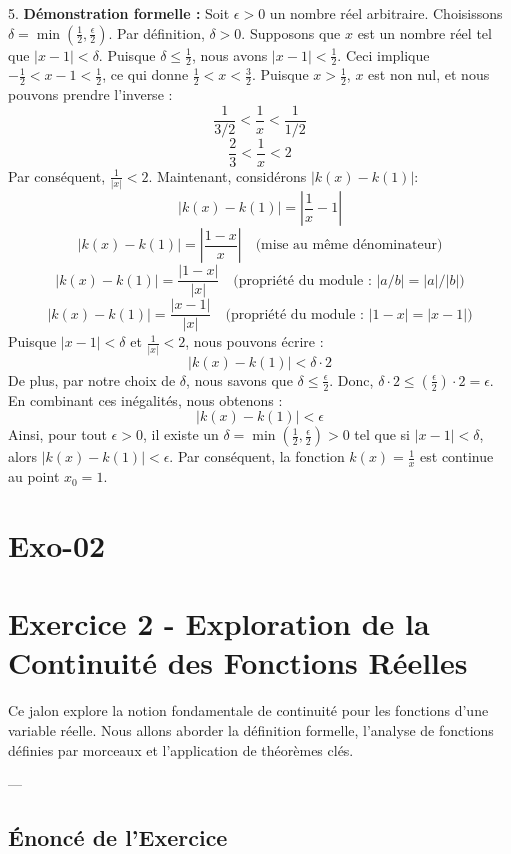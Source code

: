 \documentclass[12pt,a4paper]{report}
\begin{document}
5.  \textbf{Démonstration formelle :}
    Soit $\epsilon > 0$ un nombre réel arbitraire.
    Choisissons $\delta = \min\left(\frac{1}{2}, \frac{\epsilon}{2}\right)$. Par définition, $\delta > 0$.
    Supposons que $x$ est un nombre réel tel que $|x - 1| < \delta$.
    Puisque $\delta \le \frac{1}{2}$, nous avons $|x - 1| < \frac{1}{2}$.
    Ceci implique $-\frac{1}{2} < x - 1 < \frac{1}{2}$, ce qui donne $\frac{1}{2} < x < \frac{3}{2}$.
    Puisque $x > \frac{1}{2}$, $x$ est non nul, et nous pouvons prendre l'inverse :
    $$ \frac{1}{3/2} < \frac{1}{x} < \frac{1}{1/2} $$
    $$ \frac{2}{3} < \frac{1}{x} < 2 $$
    Par conséquent, $\frac{1}{|x|} < 2$.
    Maintenant, considérons $|k(x) - k(1)|$:
    $$ |k(x) - k(1)| = \left|\frac{1}{x} - 1\right| $$
    $$ |k(x) - k(1)| = \left|\frac{1 - x}{x}\right| \quad \text{(mise au même dénominateur)} $$
    $$ |k(x) - k(1)| = \frac{|1 - x|}{|x|} \quad \text{(propriété du module : } |a/b| = |a|/|b|) $$
    $$ |k(x) - k(1)| = \frac{|x - 1|}{|x|} \quad \text{(propriété du module : } |1-x| = |x-1|) $$
    Puisque $|x - 1| < \delta$ et $\frac{1}{|x|} < 2$, nous pouvons écrire :
    $$ |k(x) - k(1)| < \delta \cdot 2 $$
    De plus, par notre choix de $\delta$, nous savons que $\delta \le \frac{\epsilon}{2}$.
    Donc, $\delta \cdot 2 \le \left(\frac{\epsilon}{2}\right) \cdot 2 = \epsilon$.
    En combinant ces inégalités, nous obtenons :
    $$ |k(x) - k(1)| < \epsilon $$
    Ainsi, pour tout $\epsilon > 0$, il existe un $\delta = \min\left(\frac{1}{2}, \frac{\epsilon}{2}\right) > 0$ tel que si $|x - 1| < \delta$, alors $|k(x) - k(1)| < \epsilon$.
    Par conséquent, la fonction $k(x) = \frac{1}{x}$ est continue au point $x_0 = 1$.

\section{Exo-02}
\section{Exercice 2 - Exploration de la Continuité des Fonctions Réelles}

Ce jalon explore la notion fondamentale de continuité pour les fonctions d'une variable réelle. Nous allons aborder la définition formelle, l'analyse de fonctions définies par morceaux et l'application de théorèmes clés.

---

\subsection{Énoncé de l'Exercice}
\end{document}
